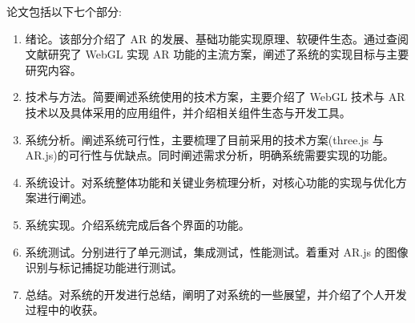 论文包括以下七个部分:
\begin{enumerate}
  \item 绪论。该部分介绍了 AR 的发展、基础功能实现原理、软硬件生态。通过查阅文献研究了 WebGL 实现 AR 功能的主流方案，阐述了系统的实现目标与主要研究内容。
  \item 技术与方法。简要阐述系统使用的技术方案，主要介绍了 WebGL 技术与 AR 技术以及具体采用的应用组件，并介绍相关组件生态与开发工具。
  \item 系统分析。阐述系统可行性，主要梳理了目前采用的技术方案(three.js 与 AR.js)的可行性与优缺点。同时阐述需求分析，明确系统需要实现的功能。
  \item 系统设计。对系统整体功能和关键业务梳理分析，对核心功能的实现与优化方案进行阐述。
  \item 系统实现。介绍系统完成后各个界面的功能。
  \item 系统测试。分别进行了单元测试，集成测试，性能测试。着重对 AR.js 的图像识别与标记捕捉功能进行测试。
  \item 总结。对系统的开发进行总结，阐明了对系统的一些展望，并介绍了个人开发过程中的收获。
\end{enumerate}
